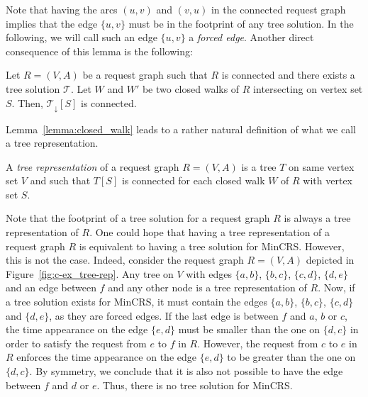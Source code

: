 \documentclass[11pt]{article}%
\begin{document}
Note that having the arcs $(u,v)$ and $(v,u)$ in the connected request graph implies that the edge $\{u,v\}$ must be in the footprint of any tree solution. In the following, we will call such an edge $\{u,v\}$ a {\it forced edge}. Another direct consequence of this lemma is the following:

\begin{corollary}
Let $R=(V,A)$ be a request graph such that $R$ is connected and there exists a tree solution $\mathcal{T}$. Let $W$ and $W'$ be two closed walks of $R$ intersecting on vertex set $S$. Then, $\mathcal{T}_{\downarrow}[S]$ is connected. 
\end{corollary} 

Lemma~\ref{lemma:closed_walk} leads to a rather natural definition of what we call a tree representation. 

\begin{definition}A {\it tree representation} of a request graph $R=(V,A)$ is a tree $T$ on same vertex set $V$ and such that $T[S]$ is connected for each closed walk $W$ of $R$ with vertex set $S$. 
\end{definition}
Note that the footprint of a tree solution for a request graph $R$ is always a tree representation of $R$. One could hope that having a tree representation of a request graph $R$ is equivalent to having a tree solution for MinCRS. However, this is not the case. Indeed, consider the request graph $R=(V,A)$ depicted in Figure~\ref{fig:c-ex_tree-rep}. Any tree on $V$ with edges $\{a,b\}$, $\{b,c\}$, $\{c,d\}$, $\{d,e\}$ and an edge between $f$ and any other node is a tree representation of $R$. Now, if a tree solution exists for MinCRS, it must contain the edges $\{a,b\}$, $\{b,c\}$, $\{c,d\}$ and $\{d,e\}$, as they are forced edges. If the last edge is between $f$ and $a$, $b$ or $c$, the time appearance on the edge $\{e,d\}$ must be smaller than the one on $\{d,c\}$ in order to satisfy the request from $e$ to $f$ in $R$. However, the request from $c$ to $e$ in $R$ enforces the time appearance on the edge $\{e,d\}$ to be greater than the one on $\{d,c\}$. By symmetry, we conclude that it is also not possible to have the edge between $f$ and $d$ or $e$. Thus, there is no tree solution for MinCRS. 
\end{document}
